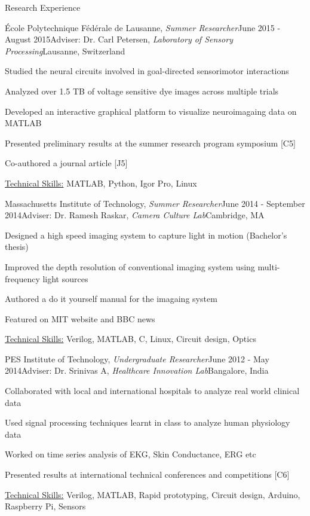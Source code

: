 \documentclass{resume}
\begin{document}
\begin{rSection}{Research Experience}
    \begin{rSubsection}{École Polytechnique Fédérale de Lausanne, \textit{Summer Researcher}}{June 2015 - August 2015}{Adviser: Dr. Carl Petersen, \textit{Laboratory of Sensory Processing}}{Lausanne, Switzerland}
\item Studied the neural circuits involved in goal-directed sensorimotor interactions
\item Analyzed over 1.5 TB of voltage sensitive dye images across multiple trials
\item Developed an interactive graphical platform to visualize neuroimagaing data on MATLAB
\item Presented preliminary results at the summer research program symposium [C5]
\item Co-authored a journal article [J5]
\item \uline{Technical Skills:} MATLAB, Python, Igor Pro, Linux
    \end{rSubsection}
    \begin{rSubsection}{Massachusetts Institute of Technology, \textit{Summer Researcher}}{June 2014 - September 2014}{Adviser: Dr. Ramesh Raskar, \textit{Camera Culture Lab}}{Cambridge, MA}
\item Designed a high speed imaging system to capture light in motion (Bachelor's thesis)
\item Improved the depth resolution of conventional imaging system using multi-frequency light sources
\item Authored a do it yourself manual for the imagaing system
\item Featured on MIT website and BBC news
\item \uline{Technical Skills:} Verilog, MATLAB, C, Linux, Circuit design, Optics
    \end{rSubsection}
    
 \begin{rSubsection}{PES Institute of Technology, \textit{Undergraduate Researcher}}{June 2012 - May 2014}{Adviser: Dr. Srinivas A, \textit{Healthcare Innovation Lab}}{Bangalore, India}
\item Collaborated with local and international hospitals to analyze real world clinical data
\item Used signal processing techniques learnt in class to analyze human physiology data
\item Worked on time series analysis of EKG, Skin Conductance, ERG etc
\item Presented results at international technical conferences and competitions [C6]
\item \uline{Technical Skills:} Verilog, MATLAB, Rapid prototyping, Circuit design, Arduino, Raspberry Pi, Sensors
 \end{rSubsection}
  \end{rSection}
\end{document}

